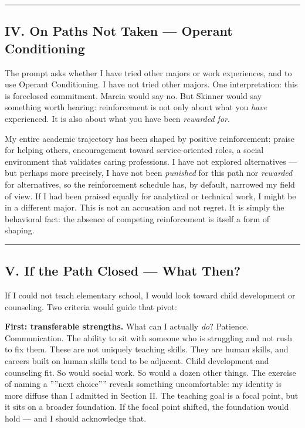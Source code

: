 \documentclass[12pt,a4paper]{article}
\begin{document}
\begin{center}
\rule{0.5\textwidth}{0.4pt}
\end{center}

\subsection{IV. On Paths Not Taken --- Operant Conditioning}

The prompt asks whether I have tried other majors or work experiences, and to use Operant Conditioning. I have not tried other majors. One interpretation: this is foreclosed commitment. Marcia would say no. But Skinner would say something worth hearing: reinforcement is not only about what you \emph{have} experienced. It is also about what you have been \emph{rewarded for}.

My entire academic trajectory has been shaped by positive reinforcement: praise for helping others, encouragement toward service-oriented roles, a social environment that validates caring professions. I have not explored alternatives --- but perhaps more precisely, I have not been \emph{punished} for this path nor \emph{rewarded} for alternatives, so the reinforcement schedule has, by default, narrowed my field of view. If I had been praised equally for analytical or technical work, I might be in a different major. This is not an accusation and not regret. It is simply the behavioral fact: the absence of competing reinforcement is itself a form of shaping.

\begin{center}
\rule{0.5\textwidth}{0.4pt}
\end{center}

\subsection{V. If the Path Closed --- What Then?}

If I could not teach elementary school, I would look toward child development or counseling. Two criteria would guide that pivot:

\textbf{First: transferable strengths.} What can I actually \emph{do}? Patience. Communication. The ability to sit with someone who is struggling and not rush to fix them. These are not uniquely teaching skills. They are human skills, and careers built on human skills tend to be adjacent. Child development and counseling fit. So would social work. So would a dozen other things. The exercise of naming a ''''next choice'''' reveals something uncomfortable: my identity is more diffuse than I admitted in Section II. The teaching goal is a focal point, but it sits on a broader foundation. If the focal point shifted, the foundation would hold --- and I should acknowledge that.
\end{document}
